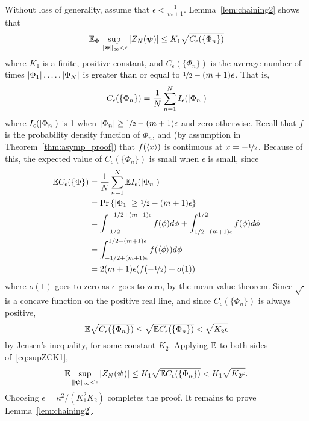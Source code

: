 \documentclass[journal]{IEEEtran}
\begin{document}
\begin{IEEEproof}
Without loss of generality, assume that $\epsilon < \frac{1}{m+1}$.  Lemma~\ref{lem:chaining2} shows that
\begin{equation}\label{eq:supZCK1} 
\expect_\Phi \sup_{\|\psibf\|_{\infty} < \epsilon} \abs{ Z_N(\psibf) } \leq K_1 \sqrt{C_\epsilon(\{\Phi_n\})}
\end{equation}
where $K_1$ is a finite, positive constant, and $C_\epsilon(\{\Phi_n\})$ is the average number of times $\left\vert \Phi_1 \right\vert, \dots, \left\vert \Phi_N \right\vert$ is greater than or equal to $\nicefrac{1}{2} - (m+1)\epsilon$.  That is,
\begin{equation}\label{eq:Cedefn}
C_\epsilon(\{\Phi_n\}) = \frac{1}{N} \sum_{n=1}^{N} I_\epsilon(\abs{\Phi_n})
\end{equation}
where $I_\epsilon(\left\vert \Phi_n \right\vert)$ is 1 when $\left\vert \Phi_n \right\vert \geq \nicefrac{1}{2} - (m+1)\epsilon$ and zero otherwise.  Recall that $f$ is the probability density function of $\Phi_n$, and (by assumption in Theorem~\ref{thm:asymp_proof}) that $f(\left\langle x \right\rangle)$ is continuous at $x = -\nicefrac{1}{2}$.  Because of this, the expected value of $C_\epsilon(\{\Phi_n\})$ is small when $\epsilon$ is small, since
\begin{align*}
{\mathbb E} C_\epsilon(\{\Phi\}) &= \frac{1}{N} \sum_{n=1}^{N} {\mathbb E} I_\epsilon(\left\vert \Phi_n \right\vert) \\
&= \operatorname{Pr}{\left\{ \left\vert \Phi_1 \right\vert \geq \nicefrac{1}{2} - (m+1)\epsilon \right\}} \\
&= \int_{-1/2}^{-1/2 + (m+1)\epsilon} f(\phi) d\phi + \int_{1/2 - (m+1)\epsilon}^{1/2} f(\phi) d\phi \\
&= \int_{-1/2 + (m+1)\epsilon}^{1/2 - (m+1)\epsilon} f(\left\langle \phi \right\rangle) d\phi \\
&= 2(m+1)\epsilon(f(-\nicefrac{1}{2}) + o(1))
\end{align*}
where $o(1)$ goes to zero as $\epsilon$ goes to zero, by the mean value theorem.  Since $\sqrt{\cdot}$ is a concave function on the positive real line, and since $C_{\epsilon}(\{\Phi_n\})$ is always positive,
\[
{\mathbb E} \sqrt{C_\epsilon(\{\Phi_n\})} \leq  \sqrt{{\mathbb E}  C_\epsilon(\{\Phi_n\} )} < \sqrt{K_2 \epsilon }
\]
by Jensen's inequality, for some constant $K_2$.  Applying ${\mathbb E}$ to both sides of~\eqref{eq:supZCK1},
\[
{\mathbb E} \sup_{\|\boldsymbol{\psi}\|_{\infty} < \epsilon} \left\vert  Z_N(\boldsymbol{\psi})  \right\vert \leq K_1 \sqrt{{\mathbb E} C_\epsilon(\{\Phi_n\})} < K_1 \sqrt{K_2 \epsilon}.
\]
Choosing $\epsilon = \kappa^2/(K_1^2 K_2)$ completes the proof.  It remains to prove Lemma~\ref{lem:chaining2}.
\end{IEEEproof}
\end{document}
